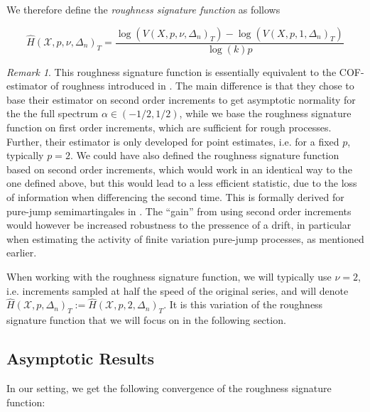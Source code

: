 \documentclass[fleqn,11pt,letterpaper]{article}
\theoremstyle{plain}
\theoremstyle{definition}
\theoremstyle{remark}
\newtheorem{remark}{Remark}[section]
\numberwithin{equation}{section}
\begin{document}
We therefore define the \emph{roughness signature function} as follows

\begin{equation}\label{eq:def_asf}
    \hat{H}(\mathcal{X},p,\nu,\Delta_n)_T = \frac{\log(V(X,p,\nu,\Delta_n)_T)-\log(V(X,p,1,\Delta_n)_T)}{\log(k)p}
\end{equation}

\begin{remark}  
    This roughness signature function is essentially equivalent to the COF-estimator of roughness introduced in \cite{Corcuera2013}. The main difference is that they chose to base their estimator on second order increments to get asymptotic normality for the the full spectrum $\alpha\in(-1/2,1/2)$, while we base the roughness signature function on first order increments, which are sufficient for rough processes. Further, their estimator is only developed for point estimates, i.e. for a fixed $p$, typically $p=2$.  We could have also defined the roughness signature function based on second order increments, which would work in an identical way to the one defined above, but this would lead to a less efficient statistic, due to the loss of information when differencing the second time. This is formally derived for pure-jump semimartingales in \cite{Todorov2013}. The ``gain'' from using second order increments would however be increased robustness to the pressence of a drift, in particular when estimating the activity of finite variation pure-jump processes, as mentioned earlier. 
\end{remark}

When working with the roughness signature function, we will typically use $\nu=2$, i.e. increments sampled at half the speed of the original series, and will denote $\hat{H}(\mathcal{X},p,\Delta_n)_T:=\hat{H}(\mathcal{X},p,2,\Delta_n)_T$. It is this variation of the roughness signature function that we will focus on in the following section.

\subsection{Asymptotic Results}\label{sec:asymptotics}
In our setting, we get the following convergence of the roughness signature function: 
\end{document}
